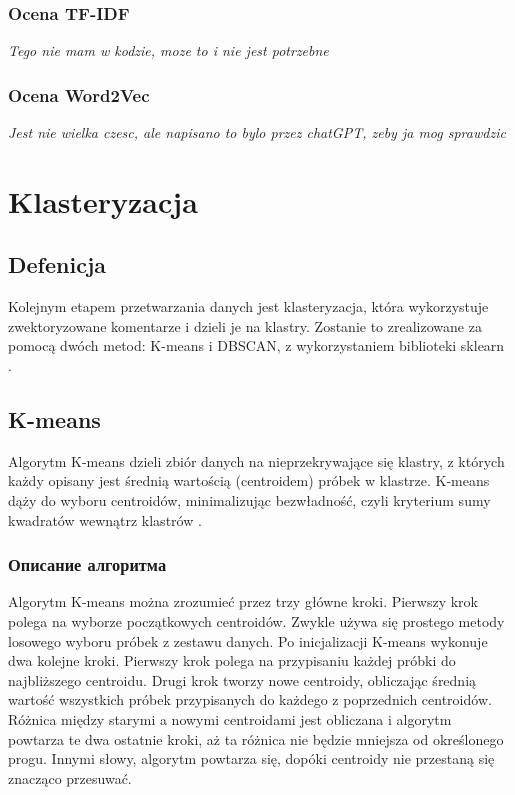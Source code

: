 		\subsubsection{Ocena  TF-IDF}
			\textit{Tego nie mam w kodzie, moze to i nie jest potrzebne}
		
		\subsubsection{Ocena  Word2Vec}
			\textit{Jest nie wielka czesc, ale napisano to bylo przez chatGPT, zeby ja mog sprawdzic}
		
	
\section{Klasteryzacja}

	\subsection{Defenicja}
		Kolejnym etapem przetwarzania danych jest klasteryzacja, która wykorzystuje zwektoryzowane komentarze i dzieli je na klastry. Zostanie to zrealizowane za pomocą dwóch metod: K-means i DBSCAN, z wykorzystaniem biblioteki sklearn \cite{scikit-learn}.  \cite{dbscan}
	
	\subsection{K-means}
 		Algorytm K-means dzieli zbiór danych na nieprzekrywające się klastry, z których każdy opisany jest średnią wartością (centroidem) próbek w klastrze. K-means dąży do wyboru centroidów, minimalizując bezwładność, czyli kryterium sumy kwadratów wewnątrz klastrów \cite{k-means}.
	
		\subsubsection{Описание алгоритма}
			Algorytm K-means można zrozumieć przez trzy główne kroki. Pierwszy krok polega na wyborze początkowych centroidów. Zwykle używa się prostego metody losowego wyboru próbek z zestawu danych. Po inicjalizacji K-means wykonuje dwa kolejne kroki. Pierwszy krok polega na przypisaniu każdej próbki do najbliższego centroidu. Drugi krok tworzy nowe centroidy, obliczając średnią wartość wszystkich próbek przypisanych do każdego z poprzednich centroidów. Różnica między starymi a nowymi centroidami jest obliczana i algorytm powtarza te dwa ostatnie kroki, aż ta różnica nie będzie mniejsza od określonego progu. Innymi słowy, algorytm powtarza się, dopóki centroidy nie przestaną się znacząco przesuwać.

